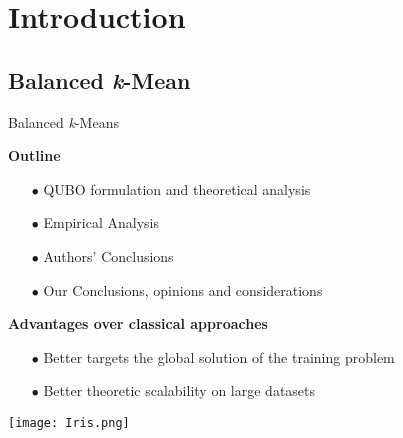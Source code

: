 \section{Introduction}

\subsection{Balanced \textit{k}-Mean}
	\begin{frame}{Balanced \textit{k}-Means} %
		\small
		\begin{minipage}{0.45\textwidth} %
			\textbf{Outline}
			\begin{itemize}
				\item[$\bullet$] QUBO formulation and theoretical analysis
				\item[$\bullet$] Empirical Analysis 
				\item[$\bullet$] Authors' Conclusions
				\item[$\bullet$] Our Conclusions, opinions and considerations
			\end{itemize}
			\textbf{Advantages over classical approaches}
			\begin{itemize}
				\item[$\bullet$] Better targets the global solution of the training problem  
				\item[$\bullet$] Better theoretic scalability on large datasets
			\end{itemize}
		\end{minipage}\hfill
		\begin{minipage}{0.55\textwidth}
			\hspace{0.2cm}
			\texttt{[image: Iris.png]}
		\end{minipage}
	\end{frame}

	



